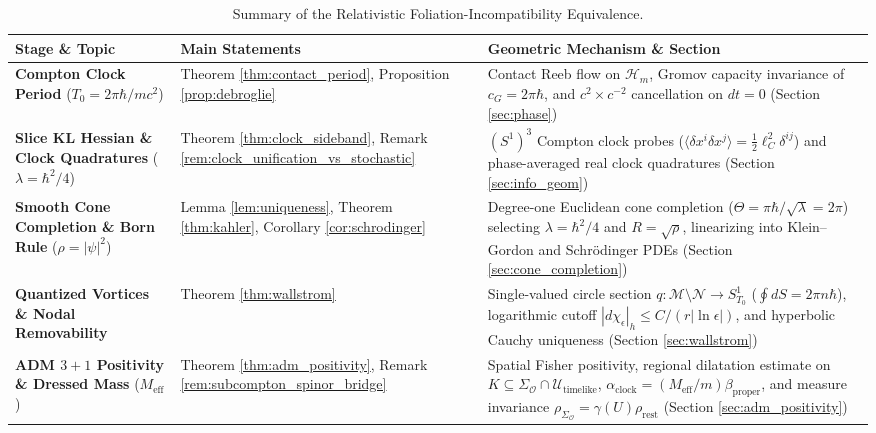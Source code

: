 \documentclass[11pt, a4paper]{article}
\theoremstyle{definition}
\begin{document}
\begin{table}[!htbp]
\centering
\caption{Summary of the Relativistic Foliation-Incompatibility Equivalence.}
\label{tab:roadmap}
\vspace{0.5em}
\footnotesize
\setlength{\tabcolsep}{4pt}
\begin{tabularx}{\textwidth}{>{\raggedright\arraybackslash}p{} >{\raggedright\arraybackslash}p{} >{\raggedright\arraybackslash}X}
\toprule
\textbf{Stage \& Topic} & \textbf{Main Statements} & \textbf{Geometric Mechanism \& Section} \\
\midrule
\textbf{Compton Clock Period} ($T_0 = 2\pi\hbar / mc^2$) & Theorem \ref{thm:contact_period}, Proposition \ref{prop:debroglie} & Contact Reeb flow on $\mathcal{H}_m$, Gromov capacity invariance of $c_G = 2\pi\hbar$, and $c^2 \times c^{-2}$ cancellation on $dt=0$ (Section \ref{sec:phase}) \\
\addlinespace
\textbf{Slice KL Hessian \& Clock Quadratures} ($\lambda = \hbar^2/4$) & Theorem \ref{thm:clock_sideband}, Remark \ref{rem:clock_unification_vs_stochastic} & $(S^1)^3$ Compton clock probes ($\langle\delta x^i\delta x^j\rangle = \frac{1}{2}\ell_C^2\delta^{ij}$) and phase-averaged real clock quadratures (Section \ref{sec:info_geom}) \\
\addlinespace
\textbf{Smooth Cone Completion \& Born Rule} ($\rho = |\psi|^2$) & Lemma \ref{lem:uniqueness}, Theorem \ref{thm:kahler}, Corollary \ref{cor:schrodinger} & Degree-one Euclidean cone completion ($\Theta = \pi\hbar/\sqrt{\lambda} = 2\pi$) selecting $\lambda = \hbar^2/4$ and $R = \sqrt{\rho}$, linearizing into Klein--Gordon and Schr\"{o}dinger PDEs (Section \ref{sec:cone_completion}) \\
\addlinespace
\textbf{Quantized Vortices \& Nodal Removability} & Theorem \ref{thm:wallstrom} & Single-valued circle section $q: \mathcal{M}\setminus\mathcal{N} \to S^1_{T_0}$ ($\oint dS = 2\pi n\hbar$), logarithmic cutoff $|d\chi_\epsilon|_h \le C/(r|\ln\epsilon|)$, and hyperbolic Cauchy uniqueness \cite{BarGinouxPfaffle2007, Bar2015} (Section \ref{sec:wallstrom}) \\
\addlinespace
\textbf{ADM $3+1$ Positivity \& Dressed Mass} ($M_{\text{eff}}$) & Theorem \ref{thm:adm_positivity}, Remark \ref{rem:subcompton_spinor_bridge} & Spatial Fisher positivity, regional dilatation estimate on $K \subseteq \Sigma_{\mathcal{O}}\cap\mathcal{U}_{\text{timelike}}$, $\alpha_{\text{clock}} = (M_{\text{eff}}/m)\beta_{\text{proper}}$, and measure invariance $\rho_{\Sigma_{\mathcal{O}}} = \gamma(U)\rho_{\text{rest}}$ (Section \ref{sec:adm_positivity}) \\

\end{tabularx}
\end{table}
\end{document}
